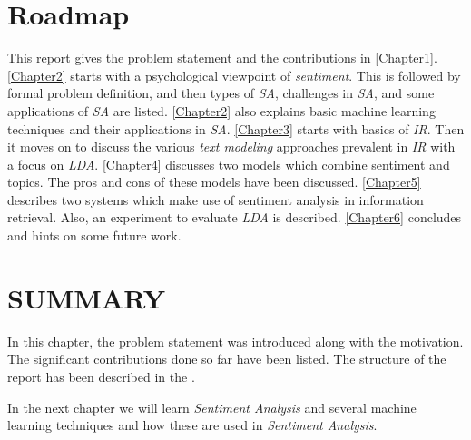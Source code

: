\section{Roadmap}\label{sec:roadmap}
\par
This report gives the problem statement and the contributions in \cref{Chapter1}. \cref{Chapter2} starts with a psychological viewpoint of \textit{sentiment}. 
This is followed by formal problem definition, and then types of \textit{SA}, challenges in \textit{SA}, and some applications of \textit{SA} are
listed. \cref{Chapter2} also explains basic machine learning techniques and their applications in \textit{SA}. \cref{Chapter3} starts
with basics of \textit{IR}. Then it moves on to discuss the various \textit{text modeling} approaches prevalent in \textit{IR} with a focus
on \textit{LDA}. \cref{Chapter4} discusses two models which combine sentiment and topics. The pros and cons of these models have been discussed. 
\cref{Chapter5} describes two systems which make use of sentiment analysis in information retrieval. Also, an experiment to evaluate \textit{LDA}
is described. \cref{Chapter6} concludes and hints on some future work.

\section*{SUMMARY}

In this chapter, the problem statement was introduced along with the motivation. The significant contributions done so far have been listed.
The structure of the report has been described in the .

In the next chapter we will learn \textit{Sentiment Analysis} and several machine learning techniques and how these are used in \textit{Sentiment Analysis}.

\clearpage

